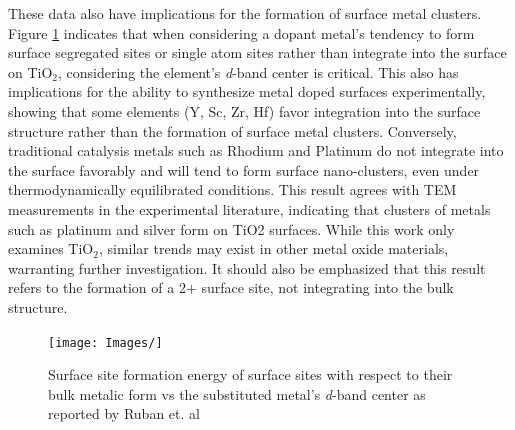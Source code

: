 These data also have implications for the formation of surface metal clusters. Figure \ref{fig:d_band} indicates that when considering a dopant metal's tendency to form surface segregated sites or single atom sites rather than integrate into the surface on TiO$_2$, considering the element's \textit{d}-band center is critical. This also has implications for the ability to synthesize metal doped surfaces experimentally, showing that some elements (Y, Sc, Zr, Hf) favor integration into the surface structure rather than the formation of surface metal clusters. Conversely, traditional catalysis metals such as Rhodium and Platinum do not integrate into the surface favorably and will tend to form surface nano-clusters, even under thermodynamically equilibrated conditions. This result agrees with TEM measurements in the experimental literature, indicating that clusters of metals such as platinum and silver form on TiO2 surfaces.\cite{Iliev_2006}  While this work only examines TiO$_2$, similar trends may exist in other metal oxide materials, warranting further investigation. It should also be emphasized that this result refers to the formation of a 2+ surface site, not integrating into the bulk structure.

\begin{figure}
    \centering
    \texttt{[image: Images/]}
    \caption{Surface site formation energy of surface sites with respect to their bulk metalic form vs the substituted metal's \textit{d}-band center as reported by Ruban et. al \cite{Ruban_1997}}
    \label{fig:d_band}
\end{figure}


